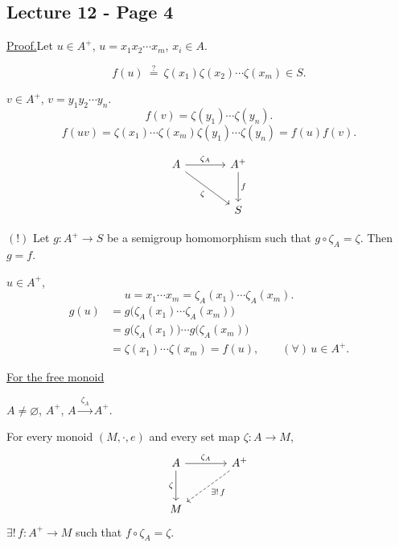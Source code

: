 
\subsection*{Lecture 12 - Page 4}

\noindent\underline{Proof.}\quad Let $u\in A^+$,
$u=x_1x_2\cdots x_m$, $x_i\in A$.

\[
f(u)\ \overset{?}{=}\ \zeta(x_1)\zeta(x_2)\cdots\zeta(x_m)\in S.
\]

\noindent $v\in A^+$, $v=y_1y_2\cdots y_n$.
\[
f(v)=\zeta(y_1)\cdots\zeta(y_n).
\]
\[
f(uv)=\zeta(x_1)\cdots\zeta(x_m)\zeta(y_1)\cdots\zeta(y_n)
=f(u)f(v).
\]

\[
\begin{tikzcd}[column sep=large,row sep=large]
A \arrow[r,"\zeta_A"] \arrow[dr,"\zeta"'] & A^+ \arrow[d,"f"] \\
& S
\end{tikzcd}
\]

\medskip
\noindent $(!)$ Let $g:A^+\longrightarrow S$ be a semigroup homomorphism
such that $g\circ\zeta_A=\zeta$. Then $g=f$.

\medskip
\noindent $u\in A^+$,
\[
u=x_1\cdots x_m=\zeta_A(x_1)\cdots\zeta_A(x_m).
\]
\begin{align*}
g(u)
 &=g\bigl(\zeta_A(x_1)\cdots\zeta_A(x_m)\bigr)\\
 &=g\bigl(\zeta_A(x_1)\bigr)\cdots g\bigl(\zeta_A(x_m)\bigr)\\
 &=\zeta(x_1)\cdots\zeta(x_m)=f(u),
 \qquad (\forall)\,u\in A^+.
\end{align*}

\bigskip
\noindent{}\quad\underline{For the free monoid}

\medskip
\noindent $A\neq\varnothing$, $A^+$,
\quad $A\xrightarrow{\ \zeta_A\ }A^+$.

\medskip
\noindent For every monoid $(M,\cdot,e)$ and every set map
$\zeta:A\longrightarrow M$,
\[
\begin{tikzcd}[column sep=large,row sep=large]
A \arrow[r,"\zeta_A"] \arrow[d,"\zeta"'] & A^+ \arrow[dl,dashed,"\exists!\,f"] \\
M &
\end{tikzcd}
\]
\noindent $\exists!\,f:A^+\longrightarrow M$ such that $f\circ\zeta_A=\zeta$.

